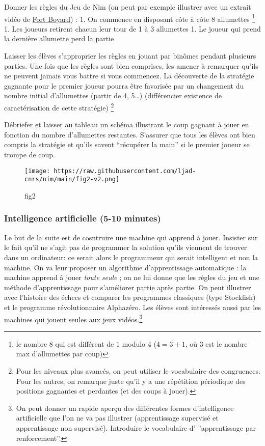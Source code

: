 Donner les règles du Jeu de Nim (on peut par exemple illustrer avec un
extrait vidéo de \href{https://fortboyard.tv}{Fort Boyard}) : 1. On
commence en disposant côte à côte 8 allumettes \footnote{le nombre \(8\)
  qui est différent de \(1\) modulo \(4\) (\(4 = 3+1\), où \(3\) est le
  nombre max d'allumettes par coup)} 1. Les joueurs retirent chacun leur
tour de 1 à 3 allumettes 1. Le joueur qui prend la dernière allumette
perd la partie

Laisser les élèves s'approprier les règles en jouant par binômes pendant
plusieurs parties. Une fois que les règles sont bien comprises, les
amener à remarquer qu'ils ne peuvent jamais vous battre si vous
commencez. La découverte de la stratégie gagnante pour le premier joueur
pourra être favorisée par un changement du nombre initial d'allumettes
(partir de 4, 5\ldots) (différencier existence de caractérisation de
cette stratégie) \footnote{Pour les niveaux plus avancés, on peut
  utiliser le vocabulaire des congruences. Pour les autres, on remarque
  juste qu'il y a une répétition périodique des positions gagnantes et
  perdantes (et des coups à jouer).}

Débriefer et laisser au tableau un schéma illustrant le coup gagnant à
jouer en fonction du nombre d'allumettes restantes. S'assurer que tous
les élèves ont bien compris la stratégie et qu'ils savent ``récupérer la
main'' si le premier joueur se trompe de coup.

\begin{figure}
\centering
\texttt{[image: https://raw.githubusercontent.com/ljad-cnrs/nim/main/fig2-v2.png]}
\caption{fig2}
\end{figure}

\hypertarget{intelligence-artificielle-5-10-minutes}{%
\subsubsection{Intelligence artificielle (5-10
minutes)}\label{intelligence-artificielle-5-10-minutes}}

Le but de la suite est de cosntruire une machine qui apprend à jouer.
Insister sur le fait qu'il ne s'agit pas de programmer la solution
qu'ils viennent de trouver dans un ordinateur: ce serait alors le
programmeur qui serait intelligent et non la machine. On va leur
proposer un algorithme d'apprentissage automatique : la machine apprend
à jouer \emph{toute seule} ; on ne lui donne que les règles du jeu et
une méthode d'apprentissage pour s'améliorer partie après partie. On
peut illustrer avec l'histoire des échecs et comparer les programmes
classiques (type Stockfish) et le programme révolutionnaire Alphazéro.
Les élèves sont intéressés aussi par les machines qui jouent seules aux
jeux vidéos.\footnote{On peut donner un rapide aperçu des différentes
  formes d'intelligence artificielle que l'on ne va pas illustrer
  (apprentissage supervisé et apprentissage non supervisé). Introduire
  le vocabulaire d' ''apprentissage par renforcement''.}

